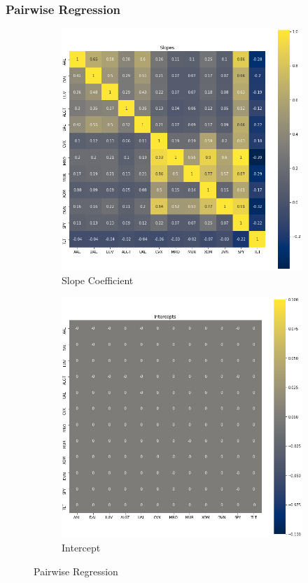 \documentclass{article}
\begin{document}
\subsubsection{Pairwise Regression}
\begin{figure}[h!]
  \centering
  \begin{subfigure}{.5\textwidth}
    \centering
    \includegraphics[width=.95\linewidth]{../Figures/pair_reg_slope.png}
    \caption{Slope Coefficient}
  \end{subfigure}%
  \begin{subfigure}{.5\textwidth}
    \centering
    \includegraphics[width=.95\linewidth]{../Figures/pair_reg_intercept.png}
    \caption{Intercept}
  \end{subfigure}
  \caption{Pairwise Regression}
\end{figure}
\end{document}
